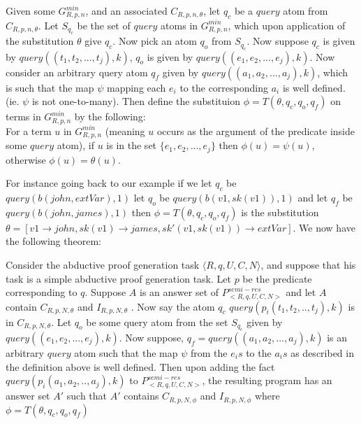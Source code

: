 \begin{definition}\label{def:derivesub}
Given some $G_{R,p,n}^{min}$, and an associated $C_{R,p,n,\theta}$, let $q_{c}$ be a $query$ atom from $C_{R,p,n,\theta}$. Let $S_{q_{c}}$ be the set of $query$ atoms in $G_{R,p,n}^{min}$, which upon application of the substitution $\theta$ give $q_{c}$. Now pick an atom $q_{o}$ from $S_{q_{c}}$. Now suppose $q_{c}$ is given by $query((t_{1},t_{2},...,t_{j}),k)$, $q_{o}$ is given by $query((e_{1},e_{2},...,e_{j}),k)$. Now consider an arbitrary query atom $q_{f}$ given by $query((a_{1},a_{2},...,a_{j}),k)$, which is such that the map $\psi$ mapping each $e_{i}$ to the corresponding $a_{i}$ is well defined. (ie. $\psi$ is not one-to-many). Then define the substituion $\phi = T(\theta, q_{c},q_{o},q_{f})$ on terms in $G_{R,p,n}^{min}$ by the following:\\ For a term $u$ in $G_{R,p,n}^{min}$ (meaning $u$ occurs as the argument of the predicate inside some $query$ atom), if $u$ is in the set $\{e_{1},e_{2},...,e_{j}\}$ then $\phi(u) = \psi(u)$, otherwise $\phi(u) = \theta(u)$.
\end{definition}
For instance going back to our example if we let $q_{c}$ be\\
$query(b(john,extVar),1)$ let $q_{o}$ be $query(b(v1,sk(v1)),1)$ and let $q_{f}$ be $query(b(john,james),1)$ then $\phi=T(\theta,q_{c},q_{o},q_{f})$ is the substitution $\theta =[v1\rightarrow john,sk(v1) \rightarrow james, sk'(v1,sk(v1))\rightarrow extVar]$. We now have the following theorem:

\begin{theorem}\label{thm:termsub}
Consider the abductive proof generation task $\langle R,q,U,C,N\rangle$, and suppose that his task is a simple abductive proof generation task. Let $p$ be the predicate corresponding to $q$. Suppose $A$ is an answer set of $P^{semi-res}_{<R,q,U,C,N>}$ and let $A$ contain $C_{R,p,N,\theta}$ and $I_{R,p,N,\theta}$ . Now
say the atom $q_{c}$ $query(p_{i}(t_{1},t_{2},..,t_{j}),k)$ is in
$C_{R,p,N,\theta}$. Let $q_{o}$ be some query atom from the set $S_{q_{c}}$
given by $query((e_{1},e_{2},...,e_{j}),k)$. Now suppose, $q_{f}=
query((a_{1},a_{2},...,a_{j}),k)$ is an arbitrary $query$ atom such that the
map $\psi$ from the $e_{i}s$ to the $a_{i}s$ as described in the definition
above is well defined. Then upon adding the fact
$query(p_{i}(a_{1},a_{2},..,a_{j}),k)$ to $P^{semi-res}_{<R,q,U,C,N>}$,
the resulting program has an answer set $A'$ such that $A'$ contains
$C_{R,p,N,\phi}$ and $I_{R,p,N,\phi}$  where $\phi = T(\theta, q_{c}, q_{o}, q_{f})$
\end{theorem} 

